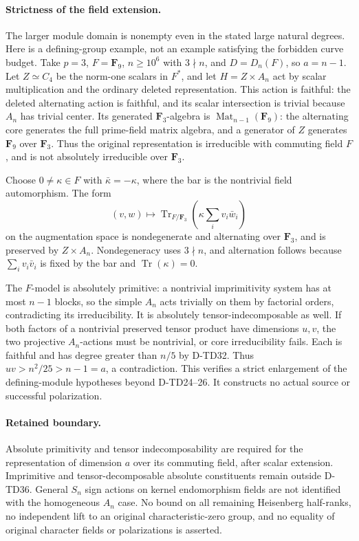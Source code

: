 \paragraph{Strictness of the field extension.}
The larger module domain is nonempty even in the stated large
natural degrees.  Here is a defining-group example, not an
example satisfying the forbidden curve budget.  Take $p=3$,
$F=\mathbf F_9$, $n\ge10^6$ with $3\nmid n$, and
$D=D_n(F)$, so $a=n-1$.  Let $Z\simeq C_4$ be the norm-one
scalars in $F^*$, and let $H=Z\times A_n$ act by scalar
multiplication and the ordinary deleted representation.
This action is faithful: the deleted alternating action is faithful,
and its scalar intersection is trivial because $A_n$ has trivial center.
Its generated $\mathbf F_3$-algebra is
$\operatorname{Mat}_{n-1}(\mathbf F_9)$: the alternating core
generates the full prime-field matrix algebra, and a generator
of $Z$ generates $\mathbf F_9$ over $\mathbf F_3$.
Thus the original representation is irreducible with commuting
field $F$, and is not absolutely irreducible over $\mathbf F_3$.

Choose $0\ne\kappa\in F$ with $\bar\kappa=-\kappa$, where
the bar is the nontrivial field automorphism.  The form
\[
       (v,w)\longmapsto
       \operatorname{Tr}_{F/\mathbf F_3}
              \left(\kappa\sum_i v_i\bar w_i\right)
 \tag{HCF.15}
\]
on the augmentation space is nondegenerate and alternating
over $\mathbf F_3$, and is preserved by $Z\times A_n$.
Nondegeneracy uses $3\nmid n$, and alternation follows because
$\sum_i v_i\bar v_i$ is fixed by the bar and
$\operatorname{Tr}(\kappa)=0$.

The $F$-model is absolutely primitive: a nontrivial imprimitivity
system has at most $n-1$ blocks, so the simple $A_n$ acts
trivially on them by factorial orders, contradicting its
irreducibility.  It is absolutely tensor-indecomposable as well.
If both factors of a nontrivial preserved tensor product have
dimensions $u,v$, the two projective $A_n$-actions must be
nontrivial, or core irreducibility fails.  Each is faithful
and has degree greater than $n/5$ by D-TD32.  Thus
$uv>n^2/25>n-1=a$, a contradiction.  This verifies a strict
enlargement of the defining-module hypotheses beyond D-TD24--26.
It constructs no actual source or successful polarization.

\paragraph{Retained boundary.}
Absolute primitivity and tensor indecomposability are required
for the representation of dimension $a$ over its commuting field,
after scalar extension.  Imprimitive and tensor-decomposable
absolute constituents remain outside D-TD36.  General $S_n$
sign actions on kernel endomorphism fields are not identified
with the homogeneous $A_n$ case.  No bound on all remaining
Heisenberg half-ranks, no independent lift to an original
characteristic-zero group, and no equality of original character
fields or polarizations is asserted.
